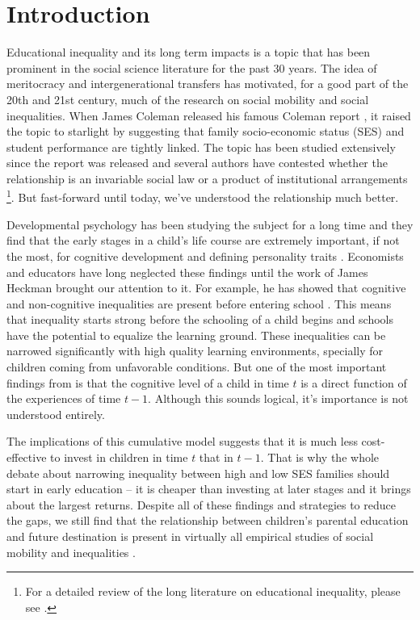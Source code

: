 \documentclass[11pt, a4paper]{article}\usepackage[]{graphicx}\usepackage[]{color}
\begin{document}


\section{Introduction}

Educational inequality and its long term impacts is a topic that has been prominent in the social science literature for the past 30 years. The idea of meritocracy and intergenerational transfers has motivated, for a good part of the 20th and 21st century, much of the research on social mobility and social inequalities. When James Coleman released his famous Coleman report \citep{coleman1966}, it raised the topic to starlight by suggesting that family socio-economic status (SES) and student performance are tightly linked. The topic has been studied extensively since the report was released and several authors have contested whether the relationship is an invariable social law or a product of institutional arrangements \footnote{For a detailed review of the long literature on educational inequality, please see \citet{gamoran2001}.}. But fast-forward until today, we've understood the relationship much better.

Developmental psychology has been studying the subject for a long time and they find that the early stages in a child's life course are extremely important, if not the most, for cognitive development and defining personality traits \citep{duyme1999, waldfogel2006}. Economists and educators have long neglected these findings until the work of James Heckman brought our attention to it. For example, he has showed that cognitive and non-cognitive inequalities are present before entering school \citep{heckman2006}. This means that inequality starts strong before the schooling of a child begins and schools have the potential to equalize the learning ground. These inequalities can be narrowed significantly with high quality learning environments, specially for children coming from unfavorable conditions. But one of the most important findings from \citet{cunha2006} is that the cognitive level of a child in time \(t\) is a direct function of the experiences of time \(t-1\). Although this sounds logical, it's importance is not understood entirely.

The implications of this cumulative model suggests that it is much less cost-effective to invest in children in time \(t\) that in \(t-1\). That is why the whole debate about narrowing inequality between high and low SES families should start in early education -- it is cheaper than investing at later stages and it brings about the largest returns. Despite all of these findings and strategies to reduce the gaps, we still find that the relationship between children's parental education and future destination is present in virtually all empirical studies of social mobility and inequalities \citep{breen1997, breen2007, waldfogel2006, bradbury2015, chetty2016}.
\end{document}
